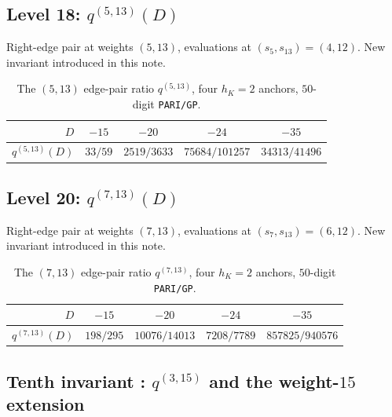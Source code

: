 \documentclass[11pt,a4paper]{amsart}
\theoremstyle{plain}
\theoremstyle{definition}
\newcommand{\qstr}[2]{q^{(#1,#2)}}
\begin{document}
\subsection{Level 18: $\qstr{5}{13}(D)$}\label{ss:lev8}

Right-edge pair at weights $(5, 13)$, evaluations at $(s_5, s_{13}) = (4, 12)$.
New invariant introduced in this note.

\begin{table}[h]
\centering
\caption{The $(5,13)$ edge-pair ratio $\qstr{5}{13}$, four $h_K = 2$ anchors,
$50$-digit \texttt{PARI/GP}.}\label{tab:level8}
\begin{tabular}{rcccc}
\toprule
$D$ & $-15$ & $-20$ & $-24$ & $-35$\\
\midrule
$\qstr{5}{13}(D)$ & $33/59$ & $2519/3633$ & $75684/101257$ & $34313/41496$\\
\bottomrule
\end{tabular}
\end{table}

\subsection{Level 20: $\qstr{7}{13}(D)$}\label{ss:lev9}

Right-edge pair at weights $(7, 13)$, evaluations at $(s_7, s_{13}) = (6, 12)$.
New invariant introduced in this note.

\begin{table}[h]
\centering
\caption{The $(7,13)$ edge-pair ratio $\qstr{7}{13}$, four $h_K = 2$ anchors,
$50$-digit \texttt{PARI/GP}.}\label{tab:level9}
\begin{tabular}{rcccc}
\toprule
$D$ & $-15$ & $-20$ & $-24$ & $-35$\\
\midrule
$\qstr{7}{13}(D)$ & $198/295$ & $10076/14013$ & $7208/7789$ & $857825/940576$\\
\bottomrule
\end{tabular}
\end{table}

\subsection{Tenth invariant : $\qstr{3}{15}$ and the weight-$15$ extension}\label{ss:level10}
\end{document}
